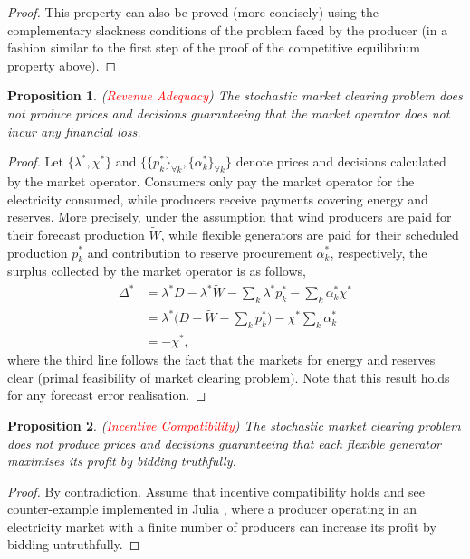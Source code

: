 \documentclass{article}
\newtheorem{proposition}{Proposition}
\begin{document}
\begin{proof}
This property can also be proved (more concisely) using the complementary slackness conditions of the problem faced by the producer (in a fashion similar to the first step of the proof of the competitive equilibrium property above). 
\end{proof}

\begin{proposition}
(\textcolor{red}{Revenue Adequacy}) The stochastic market clearing problem does not produce prices and decisions guaranteeing that the market operator does not incur any financial loss.
\end{proposition}
\begin{proof}
Let $\{\lambda^*, \chi^*\}$ and $\{\{p_k^*\}_{\forall k}, \{\alpha_k^*\}_{\forall k}\}$ denote prices and decisions calculated by the market operator. Consumers only pay the market operator for the electricity consumed, while producers receive payments covering energy and reserves. More precisely, under the assumption that wind producers are paid for their forecast production $\tilde{W}$, while flexible generators are paid for their scheduled production $p_k^*$ and contribution to reserve procurement $\alpha_k^*$, respectively, the surplus collected by the market operator is as follows,
\begin{align*}
\Delta^* &= \lambda^*D - \lambda^*\tilde{W} - \sum_k \lambda^*p_k^* - \sum_k \alpha_k^* \chi^*\\
&= \lambda^*\big(D - \tilde{W} - \sum_k p_k^*\big) - \chi^* \sum_k \alpha_k^*\\
&= -\chi^*,
\end{align*}
where the third line follows the fact that the markets for energy and reserves clear (primal feasibility of market clearing problem). Note that this result holds for any forecast error realisation.
\end{proof}

\begin{proposition}
(\textcolor{red}{Incentive Compatibility}) The stochastic market clearing problem does not produce prices and decisions guaranteeing that each flexible generator maximises its profit by bidding truthfully.
\end{proposition}
\begin{proof}
By contradiction. Assume that incentive compatibility holds and see counter-example implemented in Julia \cite{SMER2022}, where a producer operating in an electricity market with a finite number of producers can increase its profit by bidding untruthfully.
\end{proof}
\end{document}
